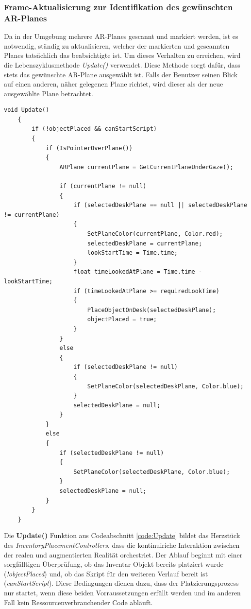 \subsubsection{Frame-Aktualisierung zur Identifikation des gewünschten AR-Planes}
Da in der Umgebung mehrere AR-Planes gescannt und markiert werden, ist es notwendig, ständig zu aktualisieren, welcher
der markierten und gescannten Planes tatsächlich das beabsichtigte ist. Um dieses Verhalten zu erreichen, wird die
Lebenszyklusmethode \textit{Update()} verwendet. Diese Methode sorgt dafür, dass stets das gewünschte AR-Plane
ausgewählt ist. Falls der Benutzer seinen Blick auf einen anderen, näher gelegenen Plane richtet, wird dieser als der
neue ausgewählte Plane betrachtet.\\

\begin{lstlisting}[style=csharp, caption={Update Funktion}, label=code:Update]
    void Update()
    {
        if (!objectPlaced && canStartScript)
        {
            if (IsPointerOverPlane())
            {
                ARPlane currentPlane = GetCurrentPlaneUnderGaze();

                if (currentPlane != null)
                {
                    if (selectedDeskPlane == null || selectedDeskPlane != currentPlane)
                    {
                        SetPlaneColor(currentPlane, Color.red);
                        selectedDeskPlane = currentPlane;
                        lookStartTime = Time.time;
                    }
                    float timeLookedAtPlane = Time.time - lookStartTime;
                    if (timeLookedAtPlane >= requiredLookTime)
                    {
                        PlaceObjectOnDesk(selectedDeskPlane);
                        objectPlaced = true;
                    }
                }
                else
                {
                    if (selectedDeskPlane != null)
                    {
                        SetPlaneColor(selectedDeskPlane, Color.blue);
                    }
                    selectedDeskPlane = null;
                }
            }
            else
            {
                if (selectedDeskPlane != null)
                {
                    SetPlaneColor(selectedDeskPlane, Color.blue);
                }
                selectedDeskPlane = null;
            }
        }
    }
\end{lstlisting}
Die \textbf{Update()} Funktion aus Codeabschnitt \ref{code:Update} bildet das Herzstück des \textit{InventoryPlacementControllers},
dass die kontinuiriche Interaktion zwischen der realen und augmentierten Realität orchestriet. Der Ablauf beginnt mit einer
sorgfälltigen Überprüfung, ob das Inventar-Objekt bereits platziert wurde (\textit{!objectPlaced}) und, ob das Skript für
den weiteren Verlauf bereit ist (\textit{canStartScript}). Diese Bedingungen dienen dazu, dass der Platzierungsprozess nur
startet, wenn diese beiden Vorraussetzungen erfüllt werden und im anderen Fall kein Ressourcenverbrauchender Code abläuft.\\


